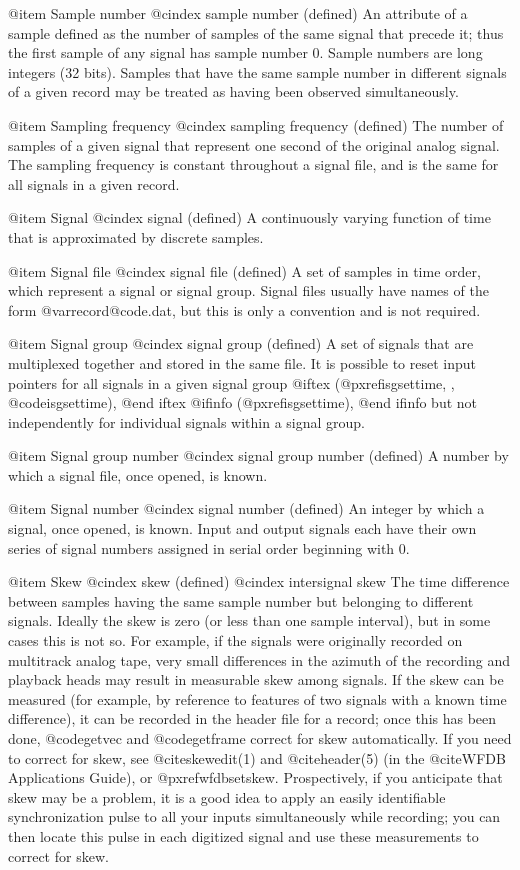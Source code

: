 {{{{{{{{{@item Sample number
@cindex sample number (defined)
An attribute of a sample defined as the number of samples of the same
signal that precede it; thus the first sample of any signal has sample
number 0.  Sample numbers are long integers (32 bits).  Samples that
have the same sample number in different signals of a given record may
be treated as having been observed simultaneously.

@item Sampling frequency
@cindex sampling frequency (defined)
The number of samples of a given signal that represent one second of
the original analog signal.  The sampling frequency is constant
throughout a signal file, and is the same for all signals in a given
record.

@item Signal
@cindex signal (defined)
A continuously varying function of time that is approximated by
discrete samples.

@item Signal file
@cindex signal file (defined)
A set of samples in time order, which represent a signal or signal
group.  Signal files usually have names of the form @var{record}@code{.dat},
but this is only a convention and is not required.

@item Signal group
@cindex signal group (defined)
A set of signals that are multiplexed together and stored in the same
file.  It is possible to reset input pointers for all signals in a
given signal group
@iftex
(@pxref{isgsettime, , @code{isgsettime}}),
@end iftex
@ifinfo
(@pxref{isgsettime}),
@end ifinfo
but not independently for individual signals within a signal group.

@item Signal group number
@cindex signal group number (defined)
A number by which a signal file, once opened, is known.

@item Signal number
@cindex signal number (defined)
An integer by which a signal, once opened, is known.  Input and output
signals each have their own series of signal numbers assigned in serial
order beginning with 0.

@item Skew
@cindex skew (defined)
@cindex intersignal skew
The time difference between samples having the same sample number but
belonging to different signals.  Ideally the skew is zero (or less than
one sample interval), but in some cases this is not so. For example, if
the signals were originally recorded on multitrack analog tape, very
small differences in the azimuth of the recording and playback heads may
result in measurable skew among signals.  If the skew can be measured
(for example, by reference to features of two signals with a known time
difference), it can be recorded in the header file for a record;
once this has been done, @code{getvec} and @code{getframe} correct for
skew automatically.  If you need to correct for skew, see
@cite{skewedit(1)} and @cite{header(5)} (in the @cite{WFDB
Applications Guide}), or @pxref{wfdbsetskew}.  Prospectively, if you
anticipate that skew may be a problem, it is a good idea to apply an
easily identifiable synchronization pulse to all your inputs
simultaneously while recording;  you can then locate this pulse in
each digitized signal and use these measurements to correct for skew.

}}}}}}}}}
